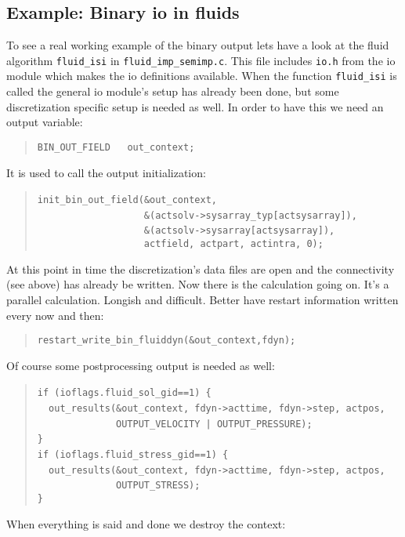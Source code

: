 \subsection{Example: Binary io in fluids}

To see a real working example of the binary output lets have a look
at the fluid algorithm \texttt{fluid{\_}isi} in \texttt{fluid{\_}imp{\_}semimp.c}.
This file includes \texttt{io.h} from the io module which makes the
io definitions available. When the function \texttt{fluid{\_}isi}
is called the general io module's setup has already been done, but
some discretization specific setup is needed as well. In order to
have this we need an output variable: 

\begin{quote}
\texttt{BIN{\_}OUT{\_}FIELD~~~out{\_}context; }
\end{quote}
It is used to call the output initialization: 

\begin{quote}
\texttt{init{\_}bin{\_}out{\_}field({\&}out{\_}context,~}~\\
 \texttt{~~~~~~~~~~~~~~~~~~~{\&}(actsolv->sysarray{\_}typ{[}actsysarray]),~}~\\
 \texttt{~~~~~~~~~~~~~~~~~~~{\&}(actsolv->sysarray{[}actsysarray]),~}~\\
 \texttt{~~~~~~~~~~~~~~~~~~~actfield,~actpart,~actintra,~0); }
\end{quote}
At this point in time the discretization's data files are open and
the connectivity (see above) has already be written. Now there is
the calculation going on. It's a parallel calculation. Longish and
difficult. Better have restart information written every now and then: 

\begin{quote}
\texttt{restart{\_}write{\_}bin{\_}fluiddyn({\&}out{\_}context,fdyn); }
\end{quote}
Of course some postprocessing output is needed as well: 

\begin{quote}
\texttt{if~(ioflags.fluid{\_}sol{\_}gid==1)~{\{}~}~\\
 \texttt{~~out{\_}results({\&}out{\_}context,~fdyn->acttime,~fdyn->step,~actpos,~}~\\
 \texttt{~~~~~~~~~~~~~~OUTPUT{\_}VELOCITY~|~OUTPUT{\_}PRESSURE);~}~\\
 \texttt{{\}}~}~\\
 \texttt{if~(ioflags.fluid{\_}stress{\_}gid==1)~{\{}~}~\\
 \texttt{~~out{\_}results({\&}out{\_}context,~fdyn->acttime,~fdyn->step,~actpos,~}~\\
 \texttt{~~~~~~~~~~~~~~OUTPUT{\_}STRESS);~}~\\
 \texttt{{\}} }
\end{quote}
When everything is said and done we destroy the context: 

